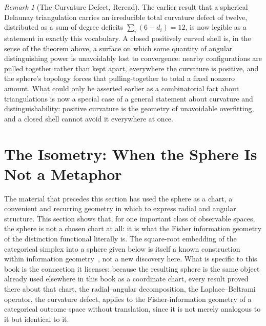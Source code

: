 \documentclass[11pt,fleqn]{book}
\numberwithin{equation}{chapter}
\theoremstyle{plain}
\theoremstyle{definition}
\theoremstyle{remark}
\newtheorem{remark}[theorem]{Remark}
\begin{document}
\begin{remark}[The Curvature Defect, Reread]
The earlier result that a spherical Delaunay triangulation carries an irreducible total curvature defect of twelve, distributed as a sum of degree deficits \(\sum_i(6-d_i)=12\), is now legible as a statement in exactly this vocabulary. A closed positively curved shell is, in the sense of the theorem above, a surface on which some quantity of angular distinguishing power is unavoidably lost to convergence: nearby configurations are pulled together rather than kept apart, everywhere the curvature is positive, and the sphere's topology forces that pulling-together to total a fixed nonzero amount. What could only be asserted earlier as a combinatorial fact about triangulations is now a special case of a general statement about curvature and distinguishability: positive curvature is the geometry of unavoidable overfitting, and a closed shell cannot avoid it everywhere at once.
\end{remark}

\section{The Isometry: When the Sphere Is Not a Metaphor}

The material that precedes this section has used the sphere as a chart, a convenient and recurring geometry in which to express radial and angular structure. This section shows that, for one important class of observable spaces, the sphere is not a chosen chart at all: it is what the Fisher information geometry of the distinction functional literally is. The square-root embedding of the categorical simplex into a sphere given below is itself a known construction within information geometry~\cite{amari2000}, not a new discovery here. What is specific to this book is the connection it licenses: because the resulting sphere is the same object already used elsewhere in this book as a coordinate chart, every result proved there about that chart, the radial--angular decomposition, the Laplace--Beltrami operator, the curvature defect, applies to the Fisher-information geometry of a categorical outcome space without translation, since it is not merely analogous to it but identical to it.
\end{document}

